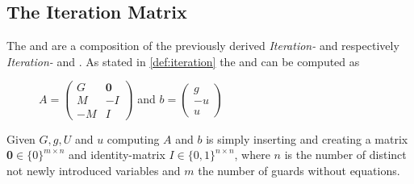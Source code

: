 \subsection{The Iteration Matrix}
The \iterationmatrix and \iterationconstants are a composition of the previously derived \textit{Iteration-} and \guardmatrix respectively \textit{Iteration- } and \guardconstants. \newline
As stated in \autoref{def:iteration} the \iterationmatrix and \iterationconstants can be computed as
\begin{figure}[H]
	\centering
	$A = \begin{pmatrix} G & \textbf{0} \\ M & -I \\ -M & I \end{pmatrix}$ and $b = \begin{pmatrix} g \\ -u \\ u \end{pmatrix}$ \cite{leike2014geometric}
\end{figure}
Given $G, g, U$ and $u$ computing $A$ and $b$ is simply inserting and creating a matrix \textbf{0}$ \in \{0\}^{m\times n}$ and identity-matrix $I \in \{0,1\}^{n\times n}$, where $n$ is the number of distinct not newly introduced variables and $m$ the number of guards without equations.

